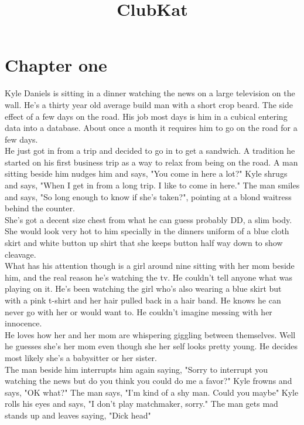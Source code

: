 \documentclass {article}[12pt]
\title {ClubKat}
\date {}
\begin{document}
\section *{Chapter one}
Kyle Daniels is sitting in a dinner watching the news on a large television on the wall. He's a thirty year old average build man with a short crop beard. The side effect of a few days on the road. His job most days is him in a cubical entering data into a database. About once a month it requires him to go on the road for a few days.\\

He just got in from a trip and decided to go in to get a sandwich. A tradition he started on his first business trip as a way to relax from being on the road. A man sitting beside him nudges him and says, "You come in here a lot?" Kyle shrugs and says, "When I get in from a long trip. I like to come in here." The man smiles and says, "So long enough to know if she's taken?", pointing at a blond waitress behind the counter.\\

She's got a decent size chest from what he can guess probably DD, a slim body. She would look very hot to him specially in the dinners uniform of a blue cloth skirt and white button up shirt that she keeps button half way down to show cleavage.\\

What has his attention though is a girl around nine sitting with her mom beside him, and the real reason he's watching the tv. He couldn't tell anyone what was playing on it. He's been watching the girl who's also wearing a blue skirt but with a pink t-shirt and her hair pulled back in a hair band. He knows he can never go with her or would want to. He couldn't imagine messing with her innocence. \\

He loves how her and her mom are whispering giggling between themselves. Well he guesses she's her mom even though she her self looks pretty young. He decides most likely she's a babysitter or her sister.\\

The man beside him interrupts him again saying, "Sorry to interrupt you watching the news but do you think you could do me a favor?" Kyle frowns and says, "OK what?" The man says, "I'm kind of a shy man. Could you maybe" Kyle rolls his eyes and says, "I don't play matchmaker, sorry." The man gets mad stands up and leaves saying, "Dick head"\\
\end{document}
